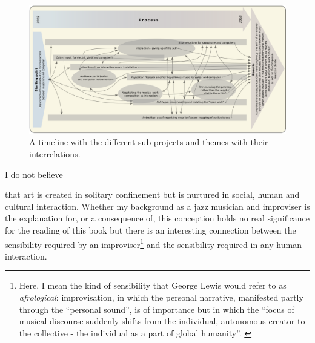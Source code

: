 \hypertarget{fig:target:main-map}{}
\begin{figure}[htb]
  \centering
  \includegraphics[width=\textwidth]{img/map8-noheader}
  \caption{A timeline with the different sub-projects and themes with their interrelations.}
  \label{fig:main-map}
\end{figure}


\hypertarget{sec:target:introduction-1}{I do not believe} that art is created in solitary confinement but is nurtured in social, human and cultural interaction. Whether my background as a jazz musician and improviser is the explanation for, or a consequence of, this conception holds no real significance for the reading of this book but there is an interesting connection between the sensibility required by an improviser\footnote{Here, I mean the kind of sensibility that George Lewis would refer to as \emph{afrological}: improvisation, in which the personal narrative, manifested partly through the ``personal sound'', is of importance but in which the ``focus of musical discourse suddenly shifts from the individual, autonomous creator to the collective - the individual as a part of global humanity''. \cite[See][110]{lewis-1}} and the sensibility required in any human interaction. 

